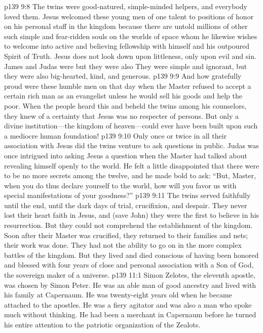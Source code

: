 \pc \vs p139 9:8 The twins were good\hyp{}natured, simple\hyp{}minded helpers, and everybody loved them. Jesus welcomed these young men of one talent to positions of honor on his personal staff in the kingdom because there are untold millions of other such simple and fear\hyp{}ridden souls on the worlds of space whom he likewise wishes to welcome into active and believing fellowship with himself and his outpoured Spirit of Truth. Jesus does not look down upon littleness, only upon evil and sin. James and Judas were  but they were also  They were simple and ignorant, but they were also big\hyp{}hearted, kind, and generous.
\vs p139 9:9 And how gratefully proud were these humble men on that day when the Master refused to accept a certain rich man as an evangelist unless he would sell his goods and help the poor. When the people heard this and beheld the twins among his counselors, they knew of a certainty that Jesus was no respecter of persons. But only a divine institution---the kingdom of heaven---could ever have been built upon such a mediocre human foundation!
\vs p139 9:10 Only once or twice in all their association with Jesus did the twins venture to ask questions in public. Judas was once intrigued into asking Jesus a question when the Master had talked about revealing himself openly to the world. He felt a little disappointed that there were to be no more secrets among the twelve, and he made bold to ask: “But, Master, when you do thus declare yourself to the world, how will you favor us with special manifestations of your goodness?”
\pc \vs p139 9:11 The twins served faithfully until the end, until the dark days of trial, crucifixion, and despair. They never lost their heart faith in Jesus, and (save John) they were the first to believe in his resurrection. But they could not comprehend the establishment of the kingdom. Soon after their Master was crucified, they returned to their families and nets; their work was done. They had not the ability to go on in the more complex battles of the kingdom. But they lived and died conscious of having been honored and blessed with four years of close and personal association with a Son of God, the sovereign maker of a universe.
\vs p139 11:1 Simon Zelotes, the eleventh apostle, was chosen by Simon Peter. He was an able man of good ancestry and lived with his family at Capernaum. He was twenty\hyp{}eight years old when he became attached to the apostles. He was a fiery agitator and was also a man who spoke much without thinking. He had been a merchant in Capernaum before he turned his entire attention to the patriotic organization of the Zealots.
